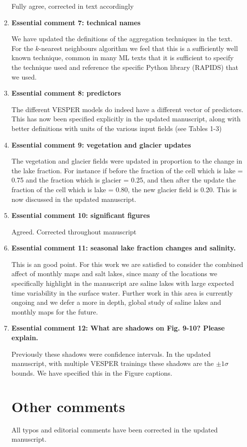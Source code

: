\documentclass[10pt]{article}
\begin{document}
\begin{enumerate}
		Fully agree, corrected in text accordingly
		
		\item \textbf{Essential comment 7: technical names}
		
		We have updated the definitions of the aggregation techniques in the text. For the $k$-nearest neighbours algorithm we feel that this is a sufficiently well known technique, common in many ML texts that it is sufficient to  specify the technique used and reference the specific Python library (RAPIDS) that we used.
	
			\item \textbf{Essential comment 8: predictors}
			
			The different VESPER models do indeed have a different vector of predictors. This has now been specified explicitly in the updated manuscript, along with better definitions with units of the various input fields (see Tables 1-3)
			
			\item \textbf{Essential comment 9:  vegetation and glacier updates}
			
			The vegetation and glacier fields were updated in proportion to the change in the lake fraction. For instance if before the fraction of the cell which is lake = 0.75 and the fraction which is glacier = 0.25, and then after the update the fraction of the cell which is lake = 0.80, the new glacier field is 0.20. This is now discussed in the updated manuscript. 
			
			
			\item \textbf{Essential comment 10:  significant figures}
			
			Agreed. Corrected throughout manuscript
			
			
			
			\item \textbf{Essential comment 11: seasonal lake fraction changes and salinity.}
			
			This is an good point. For this work we are satisfied to consider the combined affect of monthly maps and salt lakes, since many of the locations we specifically highlight in the manuscript are saline lakes with large expected time variability in the surface water. Further work in this area is currently ongoing and we defer a more in depth, global study of saline lakes and monthly maps for the future. 
			
		
			\item \textbf{Essential comment 12: What are shadows on Fig. 9-10? Please explain.}
		
		 Previously these shadows were confidence intervals. In the updated manuscript, with multiple VESPER trainings these shadows are the $\pm 1 \sigma$ bounds. We have specified this in the Figure captions.
		 
		 
		 		
	\section*{Other comments}
	All typos and editorial comments have been corrected in the updated manuscript.
	
	
\end{enumerate}
\end{document}
